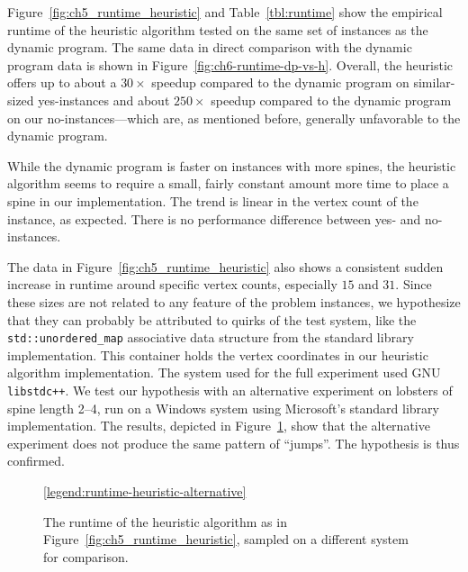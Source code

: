 Figure~\ref{fig:ch5_runtime_heuristic} and Table~\ref{tbl:runtime} show the empirical runtime of the heuristic algorithm tested on the same set of instances as the dynamic program.
The same data in direct comparison with the dynamic program data is shown in Figure~\ref{fig:ch6-runtime-dp-vs-h}.
Overall, the heuristic offers up to about a $30\times$ speedup compared to the dynamic program on similar-sized yes-instances and about $250\times$ speedup compared to the dynamic program on our no-instances---which are, as mentioned before, generally unfavorable to the dynamic program.

While the dynamic program is faster on instances with more spines, the heuristic algorithm seems to require a small, fairly constant amount more time to place a spine in our implementation. The trend is linear in the vertex count of the instance, as expected. There is no performance difference between yes- and no-instances.

The data in Figure~\ref{fig:ch5_runtime_heuristic} also shows a consistent sudden increase in runtime around specific vertex counts, especially $15$ and $31$. Since these sizes are not related to any feature of the problem instances, we hypothesize that they can probably be attributed to quirks of the test system, like the \texttt{std::unordered\_map} associative data structure from the \cpp{} standard library implementation. This container holds the vertex coordinates in our heuristic algorithm implementation. The system used for the full experiment used GNU \texttt{libstdc++}. We test our hypothesis with an alternative experiment on lobsters of spine length 2--4, run on a Windows system using Microsoft's \cpp{} standard library implementation. The results, depicted in Figure~\ref{fig:ch6-runtime-heuristic-alternative}, show that the alternative experiment does not produce the same pattern of ``jumps''. The hypothesis is thus confirmed.

\begin{figure}
    \centering %
    \scalebox{1}{}
    \scalebox{1}{}
    \ref{legend:runtime-heuristic-alternative}
    \caption[Heuristic runtime (alternative system)]{The runtime of the heuristic algorithm as in Figure~\ref{fig:ch5_runtime_heuristic}, sampled on a different system for comparison.}
    \label{fig:ch6-runtime-heuristic-alternative}
\end{figure}


